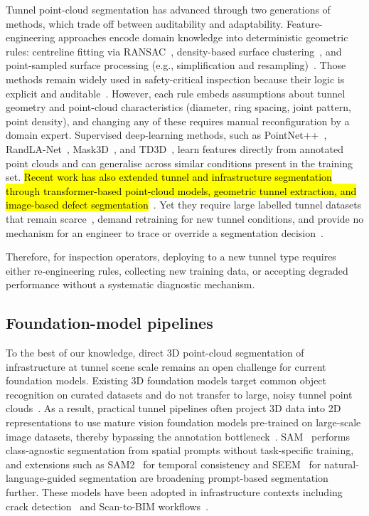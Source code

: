 \documentclass[a4paper,fleqn]{cas-dc}
\begin{document}
{Tunnel point-cloud segmentation has advanced through two generations of methods, which trade off between auditability and adaptability. Feature-engineering approaches encode domain knowledge into deterministic geometric rules: centreline fitting via RANSAC~\cite{fischler1981ransac}, density-based surface clustering~\cite{ester1996dbscan}, and point-sampled surface processing (e.g., simplification and resampling)~\cite{pauly2002}. Those methods remain widely used in safety-critical inspection because their logic is explicit and auditable~\cite{weidner2024generalized}. However, each rule embeds assumptions about tunnel geometry and point-cloud characteristics (diameter, ring spacing, joint pattern, point density), and changing any of these requires manual reconfiguration by a domain expert. Supervised deep-learning methods, such as PointNet++~\cite{qi2017pointnet}, RandLA-Net~\cite{hu2020randla}, Mask3D~\cite{schult2023mask3d}, and TD3D~\cite{kolodiazhnyi2024td3d}, learn features directly from annotated point clouds and can generalise across similar conditions present in the training set. \hl{Recent work has also extended tunnel and infrastructure segmentation through transformer-based point-cloud models, geometric tunnel extraction, and image-based defect segmentation}~\cite{wang2026serialformer, wang2025automated, yang2024yologsd, liang2026ecayolo}. Yet they require large labelled tunnel datasets that remain scarce~\cite{su2024review}, demand retraining for new tunnel conditions, and provide no mechanism for an engineer to trace or override a segmentation decision~\cite{cha2024deep}.

Therefore, for inspection operators, deploying to a new tunnel type requires either re-engineering rules, collecting new training data, or accepting degraded performance without a systematic diagnostic mechanism.

\subsection{Foundation-model pipelines}

To the best of our knowledge, direct 3D point-cloud segmentation of infrastructure at tunnel scene scale remains an open challenge for current foundation models. Existing 3D foundation models target common object recognition on curated datasets and do not transfer to large, noisy tunnel point clouds~\cite{camuffo2022recent, liu2023openshape, guo2023pointbind, xu2024pointllm}. As a result, practical tunnel pipelines often project 3D data into 2D representations to use mature vision foundation models pre-trained on large-scale image datasets, thereby bypassing the annotation bottleneck~\cite{caron2021dino, franceschelli2024training}. SAM~\cite{kirillov2023sam} performs class-agnostic segmentation from spatial prompts without task-specific training, and extensions such as SAM2~\cite{ravi2024sam2} for temporal consistency and SEEM~\cite{zou2023segment} for natural-language-guided segmentation are broadening prompt-based segmentation further. These models have been adopted in infrastructure contexts including crack detection~\cite{ge2024cracksam} and Scan-to-BIM workflows~\cite{wang2024omni, pan2024zero}.

}
\end{document}
